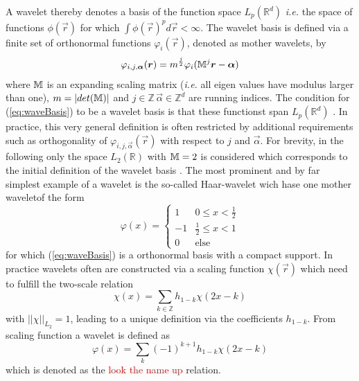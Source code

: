 A wavelet thereby denotes a basis of the function space $L_p(\mathbb{R}^d)$ \textit{i.e.} the space of functions $\phi(\vec{r})$ for which $\int \phi(\vec{r})^p d\vec{r}<\infty$. 
The wavelet basis is defined via a finite set of orthonormal functions $\varphi_i(\vec{r})$, denoted as mother wavelets, by
\begin{equation} \label{eq:waveBasis}
\varphi_{i,j,\bm{\alpha}}(\bm{r})=m^{\frac{j}{2}} \varphi_i(\mathbb{M}^j\bm{r}-\bm{\alpha})
\end{equation}
where $\mathbb{M}$ is an expanding scaling matrix (\textit{i.e.} all eigen values have modulus larger than one), $m=|det(\mathbb{M})|$ and $j\in \mathbb{Z}\, \vec{\alpha}\in \mathbb{Z}^d$ are running indices.
The condition for (\ref{eq:waveBasis}) to be a wavelet basis is that these functionst span $L_p(\mathbb{R}^d)$ \cite{dahlke}.
In practice, this very general definition is often restricted by additional requirements such as orthogonality of $\varphi_{i,j,\vec{\alpha}}(\vec{r})$ with respect to $j$ and $\vec{\alpha}$.
For brevity, in the following only the space $L_2(\mathbb{R})$ with $\mathbb{M}=2$ is considered which corresponds to the initial definition of the wavelet basis \cite{Tasche}.
The most prominent and by far simplest example of a wavelet is the so-called Haar-wavelet wich hase one mother waveletof the form
\begin{equation}
\varphi(x)=\begin{cases} 1 &0\leq x < \frac 12 \\ -1 & \frac 12 \leq x <1 \\ 0 & \text{else}\end{cases}
\end{equation}
for which (\ref{eq:waveBasis}) is a orthonormal basis with a compact support.
In practice wavelets often are constructed via a scaling function $\chi(\vec{r})$ which need to fulfill the two-scale relation
\begin{equation}
\chi(x)=\sum_{k\in\mathbb{Z}} h_{1-k} \chi(2x-k)
\end{equation}
with $||\chi||_{L_2}=1$, leading to a unique definition via the coefficients $h_{1-k}$. 
From scaling function a wavelet is defined as
\begin{equation}
\varphi(x)=\sum_k (-1)^{k+1} h_{1-k} \chi(2x-k)
\end{equation}
which is denoted as the \textcolor{red}{look the name up} relation.

